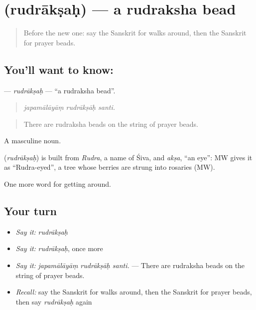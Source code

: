 \section[\texorpdfstring{\sk{रुद्राक्षः} (rudrākṣaḥ)}{रुद्राक्षः (rudrākṣaḥ)}]{ (rudrākṣaḥ) — a rudraksha bead}

\label{lesson:SA-C400-rudraksah}



\begin{quote}
Before the new one: say the Sanskrit for walks around, then the Sanskrit for prayer beads.
\end{quote}

\subsection*{You'll want to know: }
\textbf{} — \emph{rudrākṣaḥ} — \textquotedblleft{}a rudraksha bead\textquotedblright{}.

\begin{quote}
  
\end{quote}

\begin{quote}
\emph{japamālāyāṃ rudrākṣāḥ santi.}
\end{quote}

\begin{quote}
There are rudraksha beads on the string of prayer beads.
\end{quote}

A masculine noun.

\begin{cousinweb}
\textbf{} (\emph{rudrākṣaḥ}) is built from \emph{Rudra}, a name of Śiva, and \emph{akṣa}, \textquotedblleft{}an eye\textquotedblright{}: MW gives it as \textquotedblleft{}Rudra-eyed\textquotedblright{}, a tree whose berries are strung into rosaries (MW).
\end{cousinweb}

\begin{grammarlens}[title={What you've built}]
One more word for getting around.
\end{grammarlens}

\subsection*{Your turn}
\begin{itemize}
\raggedright
  \item \emph{Say it:} \emph{rudrākṣaḥ}
  \item \emph{Say it:} \emph{rudrākṣaḥ}, once more
  \item \emph{Say it:} \emph{japamālāyāṃ rudrākṣāḥ santi.} — There are rudraksha beads on the string of prayer beads.
  \item \emph{Recall:} say the Sanskrit for walks around, then the Sanskrit for prayer beads, then say \emph{rudrākṣaḥ} again
\end{itemize}

